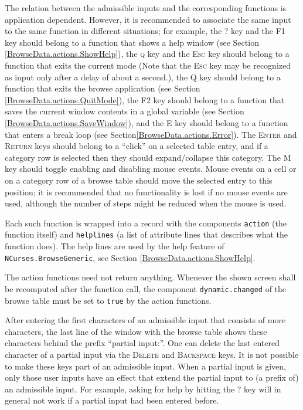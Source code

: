 \documentclass[a4paper,11pt]{report}
\begin{document}
{{ The relation between the admissible inputs and the corresponding functions is
application dependent. However, it is recommended to associate the same input
to the same function in different situations; for example, the \textsc{?} key and the \textsc{F1} key should belong to a function that shows a help window (see Section \ref{BrowseData.actions.ShowHelp}), the \textsc{q} key and the \textsc{Esc} key should belong to a function that exits the current mode (Note that the \textsc{Esc} key may be recognized as input only after a delay of about a second.), the \textsc{Q} key should belong to a function that exits the browse application (see Section \ref{BrowseData.actions.QuitMode}), the \textsc{F2} key should belong to a function that saves the current window contents in a
global variable (see Section \ref{BrowseData.actions.SaveWindow}), and the \textsc{E} key should belong to a function that enters a break loop (see
Section{\nobreakspace}\ref{BrowseData.actions.Error}). The \textsc{Enter} and \textsc{Return} keys should belong to a ``click'' on a selected table entry, and if a category row is selected then they should
expand/collapse this category. The \textsc{M} key should toggle enabling and disabling mouse events. Mouse events on a cell
or on a category row of a browse table should move the selected entry to this
position; it is recommended that no functionality is lost if no mouse events
are used, although the number of steps might be reduced when the mouse is
used. 

 Each such function is wrapped into a record with the components \texttt{action} (the function itself) and \texttt{helplines} (a list of attribute lines that describes what the function does).  The help lines are used by the help feature of \texttt{NCurses.BrowseGeneric}, see Section \ref{BrowseData.actions.ShowHelp}. 

 The action functions need not return anything. Whenever the shown screen shall
be recomputed after the function call, the component \texttt{dynamic.changed} of the browse table must be set to \texttt{true} by the action functions. 

 After entering the first characters of an admissible input that consists of
more characters, the last line of the window with the browse table shows these
characters behind the prefix ``partial input:''.  One can delete the last entered character of a partial input via the \textsc{Delete} and \textsc{Backspace} keys. It is not possible to make these keys part of an admissible input. When
a partial input is given, only those user inputs have an effect that extend
the partial input to (a prefix of) an admissible input. For example, asking
for help by hitting the \textsc{?} key will in general not work if a partial input had been entered before. }

}
\end{document}
